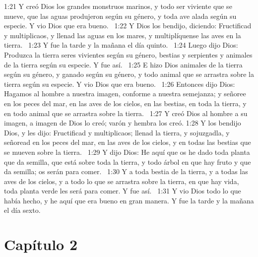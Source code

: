 1:21 Y creó Dios los grandes monstruos marinos, y todo ser viviente que se mueve, que las aguas produjeron según su género, y toda ave alada según su especie. Y vio Dios que era bueno.  
1:22 Y Dios los bendijo, diciendo: Fructificad y multiplicaos, y llenad las aguas en los mares, y multiplíquense las aves en la tierra.  
1:23 Y fue la tarde y la mañana el día quinto.  
1:24 Luego dijo Dios: Produzca la tierra seres vivientes según su género, bestias y serpientes y animales de la tierra según su especie. Y fue así.  
1:25 E hizo Dios animales de la tierra según su género, y ganado según su género, y todo animal que se arrastra sobre la tierra según su especie. Y vio Dios que era bueno.  
1:26 Entonces dijo Dios: Hagamos al hombre a nuestra imagen, conforme a nuestra semejanza; y señoree en los peces del mar, en las aves de los cielos, en las bestias, en toda la tierra, y en todo animal que se arrastra sobre la tierra.  
1:27 Y creó Dios al hombre a su imagen, a imagen de Dios lo creó; varón y hembra los creó. 
1:28 Y los bendijo Dios, y les dijo: Fructificad y multiplicaos; llenad la tierra, y sojuzgadla, y señoread en los peces del mar, en las aves de los cielos, y en todas las bestias que se mueven sobre la tierra.  
1:29 Y dijo Dios: He aquí que os he dado toda planta que da semilla, que está sobre toda la tierra, y todo árbol en que hay fruto y que da semilla; os serán para comer.  
1:30 Y a toda bestia de la tierra, y a todas las aves de los cielos, y a todo lo que se arrastra sobre la tierra, en que hay vida, toda planta verde les será para comer. Y fue así.  
1:31 Y vio Dios todo lo que había hecho, y he aquí que era bueno en gran manera. Y fue la tarde y la mañana el día sexto. 
 
\section*{Capítulo 2}

